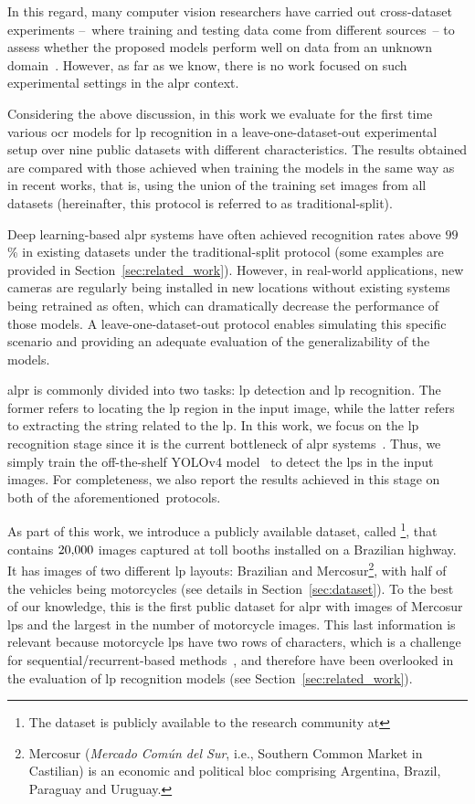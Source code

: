 In this regard, many computer vision researchers have carried out cross-dataset experiments --~where training and testing data come from different sources~-- to assess whether the proposed models perform well on data from an unknown domain~\citep{ashraf2018learning,zhang2019recent,estevam2021tell}.
However, as far as we know, there is no work focused on such experimental settings in the \gls*{alpr} context.

Considering the above discussion, in this work we evaluate for the first time various \gls*{ocr} models for \gls*{lp} recognition in a leave-one-dataset-out experimental setup over nine public datasets with different characteristics.
The results obtained are compared with those achieved when training the models in the same way as in recent works, that is, using the union of the training set images from all datasets (hereinafter, this protocol is referred to as traditional-split). 

Deep learning-based \gls*{alpr} systems have often achieved recognition rates above $99$\% in existing datasets under the traditional-split protocol (some examples are provided in Section~\ref{sec:related_work}). However, in real-world applications, new cameras are regularly being installed in new locations without existing systems being retrained as often, which can dramatically decrease the performance of those models.
A leave-one-dataset-out protocol enables simulating this specific scenario and providing an adequate evaluation of the generalizability of the models.

\gls*{alpr} is commonly divided into two tasks: \gls*{lp} detection and \gls*{lp} recognition.
The former refers to locating the \gls*{lp} region in the input image, while the latter refers to extracting the string related to the \gls*{lp}.
In this work, we focus on the \gls*{lp} recognition stage since it is the current bottleneck of \gls*{alpr} systems~\citep{laroca2021efficient}.
Thus, we simply train the off-the-shelf YOLOv4 model~\citep{bochkovskiy2020yolov4} to detect the \glspl*{lp} in the input images.
For completeness, we also report the results achieved in this stage on both of the aforementioned~protocols.

As part of this work, we introduce a publicly available dataset, called \dataset\footnote{The \dataset dataset is publicly available to the research community at \supplementary}, that contains $20{,}000$ images captured at toll booths installed on a Brazilian highway.
It has images of two different \gls*{lp} layouts: Brazilian and Mercosur\footnote{Mercosur (\textit{Mercado Com\'{u}n del Sur}, i.e., Southern Common Market in Castilian) is an economic and political bloc
comprising Argentina, Brazil, Paraguay and Uruguay.}, with half of the vehicles being motorcycles (see details in Section~\ref{sec:dataset}).
To the best of our knowledge, this is the first public dataset for \gls*{alpr} with images of Mercosur \glspl*{lp} and the largest in the number of motorcycle images.
This last information is relevant because motorcycle \glspl*{lp} have two rows of characters, which is a challenge for sequential/recurrent-based methods~\citep{silva2022flexible}, and therefore have been overlooked in the evaluation of \gls*{lp} recognition models (see Section~\ref{sec:related_work}).

